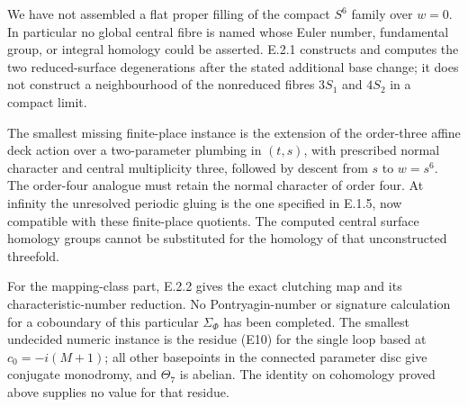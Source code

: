 \begin{problem}\label{st:E.2.3}
We have not assembled a flat proper filling of the compact $S^6$
family over $w=0$. In particular no global central fibre is named
whose Euler number, fundamental group, or integral homology could
be asserted. E.2.1 constructs and computes the two reduced-surface
degenerations after the stated additional base change; it does not
construct a neighbourhood of the nonreduced fibres $3S_1$ and
$4S_2$ in a compact limit.

The smallest missing finite-place instance is the extension of the
order-three affine deck action over a two-parameter plumbing in
$(t,s)$, with prescribed normal character and central multiplicity
three, followed by descent from $s$ to $w=s^6$. The order-four
analogue must retain the normal character of order four. At infinity
the unresolved periodic gluing is the one specified in E.1.5, now
compatible with these finite-place quotients. The computed central
surface homology groups cannot be substituted for the homology of
that unconstructed threefold.

For the mapping-class part, E.2.2 gives the exact clutching map and
its characteristic-number reduction. No Pontryagin-number or
signature calculation for a coboundary of this particular
$\Sigma_\Phi$ has been completed. The smallest undecided numeric
instance is the residue (E10) for the single loop based at
$c_0=-i(M+1)$; all other basepoints in the connected parameter disc
give conjugate monodromy, and $\Theta_7$ is abelian. The identity
on cohomology proved above supplies no value for that residue.
\end{problem}
